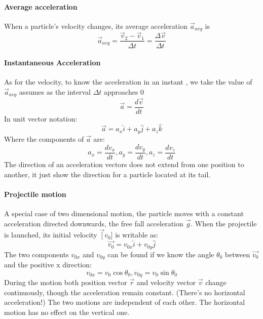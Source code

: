 \documentclass{scrartcl}
\begin{document}
    \paragraph{Average acceleration} When a particle's velocity changes, its average acceleration $\vec{a}_{avg}$ is
    \begin{equation}
        \vec{a}_{avg} = \frac{\vec{v}_2 - \vec{v}_1}{\Delta{t}} = \frac{\Delta{\vec{v}}}{\Delta{t}}
    \end{equation}
    \paragraph{Instantaneous Acceleration} As for the velocity, to know the acceleration in an instant , we take the value of $\vec{a}_{avg}$ assumes as the interval $\Delta{t}$ approaches 0
    \begin{equation}
        \vec{a} = \frac{d\vec{v}}{dt}
    \end{equation}
    In unit vector notation:
    \begin{equation}
        \vec{a} = a_x \hat{i} + a_y \hat{j} + a_z \hat{k}
    \end{equation}
    Where the components of $\vec{a}$ are:
    \begin{equation}
        a_x = \frac{dv_x}{dt} , a_y = \frac{dv_y}{dt} , a_z = \frac{dv_z}{dt}
    \end{equation}
    The direction of an acceleration vectors does not extend from one position to another, it just show the direction for a particle located at its tail. 
    \paragraph{Projectile motion} A special case of two dimensional motion, the particle moves with a constant acceleration directed downwards, the free fall acceleration $\vec{g}$. When the projectile is launched, its initial velocity $\vec[v_0]$ is writable as: 
    \begin{equation}
        \vec{v_0} = v_{0x} \hat{i} + v_{0y} \hat{j}
    \end{equation}
    The two components $v_{0x}$ and $v_{0y}$ can be found if we know the angle $\theta_{0}$ between $\vec{v_0}$ and the positive x direction:
    \begin{equation}
        v_{0x} = v_0 \cos{\theta_0} , v_{0y} = v_0 \sin{\theta_0} 
    \end{equation}
    During the motion both position vector $\vec{r}$ and velocity vector $\vec{v}$ change continuously, though the acceleration remain constant. (There's no horizontal acceleration!)
    The two motions are independent of each other. The horizontal motion has no effect on the vertical one.
    
\end{document}
